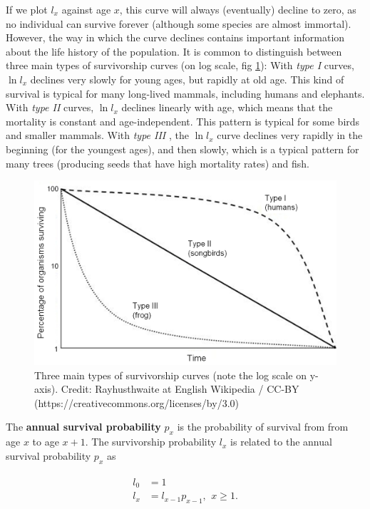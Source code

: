 \documentclass[
]{book}
\begin{document}
If we plot \(l_x\) against age \(x\), this curve will always (eventually) decline to zero, as no individual can survive forever (although some species are almost immortal). However, the way in which the curve declines contains important information about the life history of the population. It is common to distinguish between three main types of survivorship curves (on log scale, fig \ref{fig:fig1}): With \emph{type I} curves, \(\ln l_x\) declines very slowly for young ages, but rapidly at old age. This kind of survival is typical for many long-lived mammals, including humans and elephants. With \emph{type II} curves, \(\ln l_x\) declines linearly with age, which means that the mortality is constant and age-independent. This pattern is typical for some birds and smaller mammals. With \emph{type III} , the \(\ln l_x\) curve declines very rapidly in the beginning (for the youngest ages), and then slowly, which is a typical pattern for many trees (producing seeds that have high mortality rates) and fish.

\begin{figure}
\includegraphics[width=0.7\linewidth]{Survivorship_Curves} \caption{Three main types of survivorship curves (note the log scale on y-axis). Credit: Rayhusthwaite at English Wikipedia / CC-BY (https://creativecommons.org/licenses/by/3.0)}\label{fig:fig1}
\end{figure}

The \textbf{annual survival probability} \(p_x\) is the probability of survival from from age \(x\) to age \(x+1\). The survivorship probability \(l_x\) is related to the annual survival probability \(p_x\) as

\begin{align}
\begin{split}
l_0&=1\\
l_x&=l_{x-1}p_{x-1},\,\:x\geq 1.
\end{split}
\label{eq:survival}
\end{align}
\end{document}
